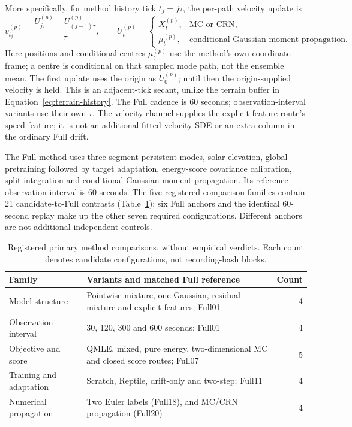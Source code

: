 \documentclass[11pt]{article}
\begin{document}
More specifically, for method history tick \(t_j=j\tau\), the per-path
velocity update is
\begin{equation}
 v^{(p)}_{t_j}=\frac{U^{(p)}_{j\tau}-U^{(p)}_{(j-1)\tau}}{\tau},\qquad
 U^{(p)}_t=\begin{cases}
 X^{(p)}_t,&\text{MC or CRN},\\
 \mu^{(p)}_t,&\text{conditional Gaussian-moment propagation}.
 \end{cases}
 \label{eq:method-history}
\end{equation}
Here positions and conditional centres \(\mu^{(p)}_t\) use the method's own
coordinate frame; a centre is conditional on that sampled mode path, not the
ensemble mean. The first update uses the origin as \(U^{(p)}_0\); until then
the origin-supplied velocity is held. This is an adjacent-tick secant, unlike
the terrain buffer in Equation~\eqref{eq:terrain-history}. The Full cadence is
60 seconds; observation-interval variants use their own \(\tau\). The velocity
channel supplies the explicit-feature route's speed feature; it is not an
additional fitted velocity SDE or an extra column in the ordinary Full drift.

The Full method uses three segment-persistent modes, solar elevation, global
pretraining followed by target adaptation, energy-score covariance calibration,
split integration and conditional Gaussian-moment propagation. Its reference
observation interval is 60 seconds. The five registered comparison families
contain 21 candidate-to-Full contrasts (Table~\ref{tab:method-families}); six
Full anchors and the identical 60-second replay make up the other seven
required configurations. Different anchors are not additional independent controls.

\begin{table}[htbp]
\centering\small
\caption{Registered primary method comparisons, without empirical verdicts.
Each count denotes candidate configurations, not recording-hash blocks.}
\label{tab:method-families}
\begin{tabular}{p{.24\linewidth}p{.57\linewidth}r}
\hline
Family & Variants and matched Full reference & Count\\
\hline
Model structure & Pointwise mixture, one Gaussian, residual mixture and
explicit features; Full01 & 4\\
Observation interval & 30, 120, 300 and 600 seconds; Full01 & 4\\
Objective and score & QMLE, mixed, pure energy, two-dimensional MC and
closed score routes; Full07 & 5\\
Training and adaptation & Scratch, Reptile, drift-only and two-step;
Full11 & 4\\
Numerical propagation & Two Euler labels (Full18), and MC/CRN
propagation (Full20) & 4\\
\hline
\end{tabular}
\end{table}
\end{document}
